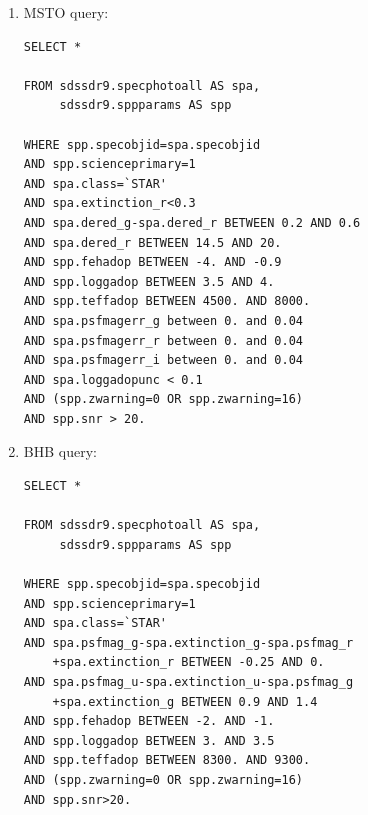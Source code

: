 \documentclass[useAMS,twocolumn,usenatbib]{mn2e}
\begin{document}
\begin{enumerate}
\item MSTO query:
%
\begin{verbatim}
SELECT *

FROM sdssdr9.specphotoall AS spa,
     sdssdr9.sppparams AS spp

WHERE spp.specobjid=spa.specobjid
AND spp.scienceprimary=1 
AND spa.class=`STAR' 
AND spa.extinction_r<0.3
AND spa.dered_g-spa.dered_r BETWEEN 0.2 AND 0.6 
AND spa.dered_r BETWEEN 14.5 AND 20. 
AND spp.fehadop BETWEEN -4. AND -0.9 
AND spp.loggadop BETWEEN 3.5 AND 4. 
AND spp.teffadop BETWEEN 4500. AND 8000.
AND spa.psfmagerr_g between 0. and 0.04
AND spa.psfmagerr_r between 0. and 0.04
AND spa.psfmagerr_i between 0. and 0.04
AND spa.loggadopunc < 0.1 
AND (spp.zwarning=0 OR spp.zwarning=16)
AND spp.snr > 20.
\end{verbatim}
%
\item BHB query:
%
\begin{verbatim}
SELECT * 

FROM sdssdr9.specphotoall AS spa,
     sdssdr9.sppparams AS spp
     
WHERE spp.specobjid=spa.specobjid
AND spp.scienceprimary=1
AND spa.class=`STAR'
AND spa.psfmag_g-spa.extinction_g-spa.psfmag_r
    +spa.extinction_r BETWEEN -0.25 AND 0.
AND spa.psfmag_u-spa.extinction_u-spa.psfmag_g
    +spa.extinction_g BETWEEN 0.9 AND 1.4
AND spp.fehadop BETWEEN -2. AND -1.
AND spp.loggadop BETWEEN 3. AND 3.5
AND spp.teffadop BETWEEN 8300. AND 9300.
AND (spp.zwarning=0 OR spp.zwarning=16)
AND spp.snr>20.
\end{verbatim}
\end{enumerate}
\end{document}
